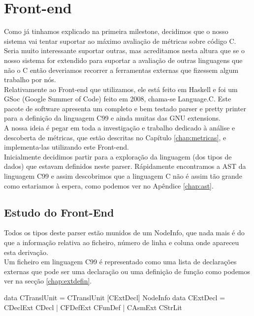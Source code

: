 \chapter{Front-end}
\minitoc
Como já tinhamos explicado na primeira milestone, decidimos que o nosso sistema vai tentar suportar ao máximo avaliação de métricas sobre código C.
Seria muito interessante suportar outras, mas acreditamos nesta altura que se o nosso sistema for extendido para suportar a avaliação de outras linguagens que não o C
então deveriamos recorrer a ferramentas externas que fizessem algum trabalho por nós.\\
Relativamente ao Front-end que utilizamos, ele está feito em Haskell e foi um GSoc (Google Summer of Code) feito em 2008, chama-se Language.C.
Este pacote de software apresenta um completo e bem testado parser e pretty printer para a definição da linguagem \textrm{C99} e ainda muitas das \textrm{GNU extensions}.\\

A nossa ideia é pegar em toda a investigação e trabalho dedicado à análise e descoberta de métricas, que estão descritas no Capítulo \ref{chap:metricas}, e implementa-las
utilizando este Front-end.\\

Inicialmente decidimos partir para a exploração da linguagem (dos tipos de dados) que estavam definidos neste parser. Rápidamente encontramos a AST da linguagem \textrm{C99}
e assim descobrimos que a linguagem C não é assim tão grande como estariamos à espera, como podemos ver no Apêndice \ref{chap:ast}.

\section{Estudo do Front-End}
Todos os tipos deste parser estão munidos de um \textrm{NodeInfo}, que nada mais é do que a informação relativa ao ficheiro, número de linha e coluna onde apareceu
esta derivação.\\
Um ficheiro em linguagem \textrm{C99} é representado como uma lista de declarações externas que pode ser uma declaração ou uma definição de função como podemos ver
na secção \ref{chap:extdefin}.

\begin{haskell}
data CTranslUnit = CTranslUnit [CExtDecl] NodeInfo
data CExtDecl = CDeclExt CDecl
              | CFDefExt CFunDef
			  | CAsmExt CStrLit
\end{haskell}

